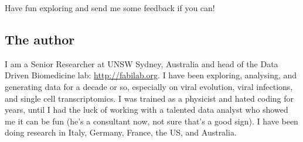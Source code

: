 \documentclass[12pt,a4paper,notitlepage,onecolumn]{article}
\begin{document}
Have fun exploring and send me some feedback if you can!

\subsection*{The author}
I am a Senior Researcher at UNSW Sydney, Australia and head of the Data Driven Biomedicine lab: \url{http://fabilab.org}. I have been exploring, analysing, and generating data for a decade or so, especially on viral evolution, viral infections, and single cell transcriptomics. I was trained as a physicist and hated coding for years, until I had the luck of working with a talented data analyst who showed me it can be fun (he's a consultant now, not sure that's a good sign). I have been doing research in Italy, Germany, France, the US, and Australia.

\newpage
\tableofcontents

%
%
\end{document}
